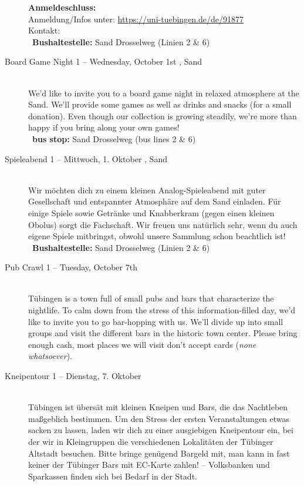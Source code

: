 \begin{description}
    \textbf{Anmeldeschluss:} \matheanmeldung\YEAR\\
    Anmeldung/Infos unter: \url{https://uni-tuebingen.de/de/91877}\\
    Kontakt: \texttt{\mathkontakt}
    \ifsommersemester
        \\ ~\textbf{Bushaltestelle:} Sand Drosselweg (Linien 2 \& 6)
    \fi
\fi


\ifml
    \item[Board Game Night 1 -- Wednesday, October 1st \YEAR, Sand]~\\%
    We'd like to invite you to a board game night in relaxed atmosphere at the Sand.
    We'll provide some games as well as drinks and snacks (for a small donation).
    Even though our collection is growing steadily, we're more than happy if you bring along your own games!\\
    ~\textbf{bus stop:} Sand Drosselweg (bus lines 2 \& 6)
\else
    \item[Spieleabend 1 -- Mittwoch, 1. Oktober \YEAR, Sand]~\\%
    Wir möchten dich zu einem kleinen Analog-Spieleabend mit guter Gesellschaft und entspannter Atmosphäre auf dem Sand einladen.
    Für einige Spiele sowie Getränke und Knabberkram (gegen einen kleinen Obolus) sorgt die Fachschaft.
    Wir freuen uns natürlich sehr, wenn du auch eigene Spiele mitbringst, obwohl unsere Sammlung schon beachtlich ist!\\
    ~\textbf{Bushaltestelle:} Sand Drosselweg (Linien 2 \& 6)
\fi

\ifml
    \item[Pub Crawl 1 -- Tuesday, October 7th \YEAR]~\\
    Tübingen is a town full of small pubs and bars that characterize the nightlife.
    To calm down from the stress of this information-filled day, we'd like to invite you to go bar-hopping with us.
    We'll divide up into small groups and visit the different bars in the historic town center.
    Please bring enough cash, most places we will visit don't accept cards (\emph{none whatsoever}).
\else
    \item[Kneipentour 1 -- Dienstag, 7. Oktober \YEAR]~\\
    Tübingen ist übersät mit kleinen Kneipen und Bars, die das Nachtleben maßgeblich bestimmen.
    Um den Stress der ersten Veranstaltungen etwas sacken zu lassen, laden wir dich zu einer ausgiebigen Kneipentour ein,
    bei der wir in Kleingruppen die verschiedenen Lokalitäten der Tübinger Altstadt besuchen.
    Bitte bringe genügend Bargeld mit, man kann in fast keiner der Tübinger Bars mit EC-Karte zahlen! -- Volksbanken und Sparkassen finden sich bei Bedarf in der Stadt.
\fi


\end{description}

